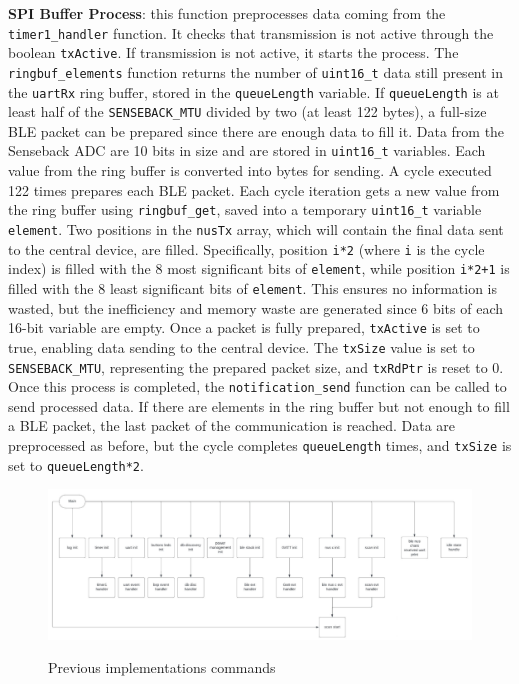 \documentclass{Configuration_Files/PoliMi3i_thesis}
\begin{document}
\textbf{SPI Buffer Process}: this function preprocesses data coming from the \texttt{timer1\_handler} function. It checks that transmission is not active through the boolean \texttt{txActive}. If transmission is not active, it starts the process. The \texttt{ringbuf\_elements} function returns the number of \texttt{uint16\_t} data still present in the \texttt{uartRx} ring buffer, stored in the \texttt{queueLength} variable. If \texttt{queueLength} is at least half of the \texttt{SENSEBACK\_MTU} divided by two (at least 122 bytes), a full-size BLE packet can be prepared since there are enough data to fill it. Data from the Senseback ADC are 10 bits in size and are stored in \texttt{uint16\_t} variables. Each value from the ring buffer is converted into bytes for sending. A cycle executed 122 times prepares each BLE packet. Each cycle iteration gets a new value from the ring buffer using \texttt{ringbuf\_get}, saved into a temporary \texttt{uint16\_t} variable \texttt{element}. Two positions in the \texttt{nusTx} array, which will contain the final data sent to the central device, are filled. Specifically, position \texttt{i*2} (where \texttt{i} is the cycle index) is filled with the 8 most significant bits of \texttt{element}, while position \texttt{i*2+1} is filled with the 8 least significant bits of \texttt{element}. This ensures no information is wasted, but the inefficiency and memory waste are generated since 6 bits of each 16-bit variable are empty. Once a packet is fully prepared, \texttt{txActive} is set to true, enabling data sending to the central device. The \texttt{txSize} value is set to \texttt{SENSEBACK\_MTU}, representing the prepared packet size, and \texttt{txRdPtr} is reset to 0. Once this process is completed, the \texttt{notification\_send} function can be called to send processed data. If there are elements in the ring buffer but not enough to fill a BLE packet, the last packet of the communication is reached. Data are preprocessed as before, but the cycle completes \texttt{queueLength} times, and \texttt{txSize} is set to \texttt{queueLength*2}.

\begin{figure}[H]
	\includegraphics[scale=0.3]{Previous Implementation/Screenshot 2024-08-15 at 11.01.10.png}
	\centering
    \label{prev_5}
    \caption{Previous implementations commands}
\end{figure}
\end{document}
